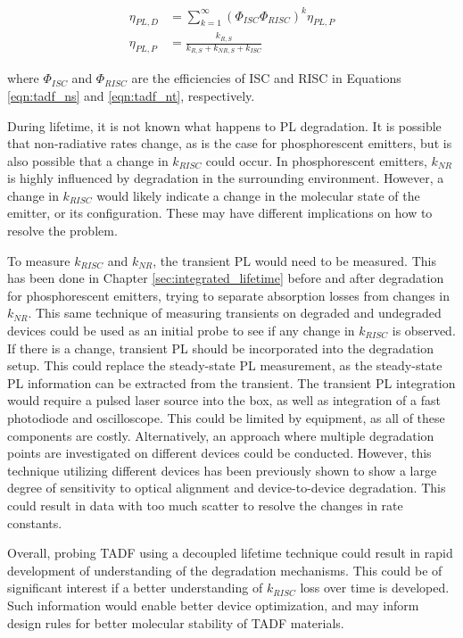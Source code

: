 \documentclass[../thesis.tex]{subfiles}
\begin{document}
\begin{eqnarray}
\eta_{PL,D} &= \sum_{k=1}^\infty (\Phi_{ISC}\Phi_{RISC})^k \eta_{PL,P} \\
\eta_{PL,P} &= \frac{k_{R,S}}{k_{R,S}+k_{NR,S}+k_{ISC}}
\end{eqnarray}

where $\Phi_{ISC}$ and $\Phi_{RISC}$ are the efficiencies of ISC and RISC in Equations \ref{eqn:tadf_ns} and \ref{eqn:tadf_nt}, respectively.

During lifetime, it is not known what happens to PL degradation.
It is possible that non-radiative rates change, as is the case for phosphorescent emitters, but is also possible that a change in $k_{RISC}$ could occur.
In phosphorescent emitters, $k_{NR}$ is highly influenced by degradation in the surrounding environment.\supercite{Bangsund2018a,Bangsund2018,Hershey2017}
However, a change in $k_{RISC}$ would likely indicate a change in the molecular state of the emitter, or its configuration.
These may have different implications on how to resolve the problem.

To measure $k_{RISC}$ and $k_{NR}$, the transient PL would need to be measured.
This has been done in Chapter \ref{sec:integrated_lifetime} before and after degradation for phosphorescent emitters, trying to separate absorption losses from changes in $k_{NR}$.
This same technique of measuring transients on degraded and undegraded devices could be used as an initial probe to see if any change in $k_{RISC}$ is observed.
If there is a change, transient PL should be incorporated into the degradation setup.
This could replace the steady-state PL measurement, as the steady-state PL information can be extracted from the transient.  
The transient PL integration would require a pulsed laser source into the box, as well as integration of a fast photodiode and oscilloscope.  
This could be limited by equipment, as all of these components are costly.
Alternatively, an approach where multiple degradation points are investigated on different devices could be conducted.
However, this technique utilizing different devices has been previously shown to show a large degree of sensitivity to optical alignment and device-to-device degradation.
This could result in data with too much scatter to resolve the changes in rate constants.

Overall, probing TADF using a decoupled lifetime technique could result in rapid development of understanding of the degradation mechanisms.
This could be of significant interest if a better understanding of $k_{RISC}$ loss over time is developed.
Such information would enable better device optimization, and may inform design rules for better molecular stability of TADF materials.
\end{document}
